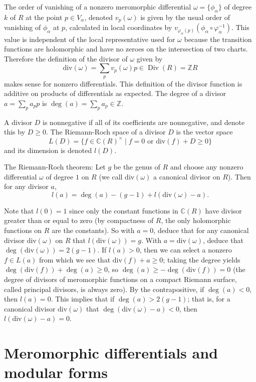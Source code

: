 \documentclass[11pt,leqno]{article}
\theoremstyle{plain}
\theoremstyle{definition}
\numberwithin{equation}{section}
\numberwithin{lem}{section}
\DeclareMathOperator{\Div}{Div}
\renewcommand{\div}{\text{div}}
\begin{document}
The order of vanishing of a nonzero meromorphic differential $\omega = \{\phi_\alpha\}$ of degree $k$ of $R$ at the point $p\in V_\alpha$, denoted $v_p(\omega)$ is given by the usual order of vanishing of $\phi_\alpha$ at $p$, calculated in local coordinates by $v_{\varphi_\alpha (p)}(\phi_\alpha\circ\varphi_\alpha^{-1})$. This value is independent of the local representative used for $\omega$ because the transition functions are holomorphic and have no zeroes on the intersection of two charts. Therefore the definition of the divisor of $\omega$ given by 
\[\div(\omega) = \sum_pv_p(\omega)p\in \Div(R) = \mathbb ZR\]
makes sense for nonzero differentials. This definition of the divisor function is additive on products of differentials as expected. The degree of a divisor $a = \sum_p a_pp$ is $\deg(a) = \sum_p a_p\in\mathbb Z$.

A divisor $D$ is nonnegative if all of its coefficients are nonnegative, and denote this by $D\geq 0$. The Riemann-Roch space of a divisor $D$ is the vector space 
\[L(D) = \{f\in \mathbb C(R)^\times\mid f = 0\text{ or } \div(f)+D \geq 0\}\] and its dimension is denoted $l(D)$.

The Riemann-Roch theorem: Let $g$ be the genus of $R$ and choose any nonzero differential $\omega$ of degree $1$ on $R$ (we call $\div(\omega)$ a canonical divisor on $R$). Then for any divisor $a$, 
\[l(a) = \deg(a) - (g-1) + l(\div(\omega)-a).\]

Note that $l(0) = 1$ since only the constant functions in $\mathbb C(R)$ have divisor greater than or equal to zero (by compactness of $R$, the only holomorphic functions on $R$ are the constants). So with $a = 0$, deduce that for any canonical divisor $\div(\omega)$ on $R$ that $l(\div(\omega)) = g$. With $a = \div(\omega)$, deduce that $\deg(\div(\omega)) = 2(g-1)$. If $l(a)>0$, then we can select a nonzero $f\in L(a)$ from which we see that $\div(f)+a\geq 0$; taking the degree yields $\deg(\div(f))+\deg(a)\geq 0$, so $\deg(a)\geq -\deg(\div(f)) = 0$ (the degree of divisors of meromorphic functions on a compact Riemann surface, called principal divisors, is always zero). By the contrapositive, if $\deg(a)<0$, then $l(a) = 0$. This implies that if $\deg(a)>2(g-1)$; that is, for a canonical divisor $\div(\omega)$ that $\deg(\div(\omega)-a)<0$, then $l(\div(\omega)-a) = 0$.

\newpage
\section{Meromorphic differentials and modular forms}
\end{document}
